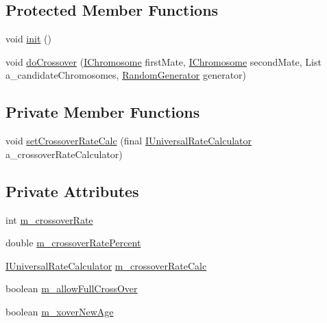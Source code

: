 \subsection*{Protected Member Functions}
\begin{DoxyCompactItemize}
\item 
void \hyperlink{classorg_1_1jgap_1_1impl_1_1_crossover_operator_aa912b24ed525835736758d64e373207d}{init} ()
\item 
void \hyperlink{classorg_1_1jgap_1_1impl_1_1_crossover_operator_a4e72f9a7da7293b0efd6c227ce496f22}{do\-Crossover} (\hyperlink{interfaceorg_1_1jgap_1_1_i_chromosome}{I\-Chromosome} first\-Mate, \hyperlink{interfaceorg_1_1jgap_1_1_i_chromosome}{I\-Chromosome} second\-Mate, List a\-\_\-candidate\-Chromosomes, \hyperlink{interfaceorg_1_1jgap_1_1_random_generator}{Random\-Generator} generator)
\end{DoxyCompactItemize}
\subsection*{Private Member Functions}
\begin{DoxyCompactItemize}
\item 
void \hyperlink{classorg_1_1jgap_1_1impl_1_1_crossover_operator_ac91121e8161678732d4b8c74cf793913}{set\-Crossover\-Rate\-Calc} (final \hyperlink{interfaceorg_1_1jgap_1_1_i_universal_rate_calculator}{I\-Universal\-Rate\-Calculator} a\-\_\-crossover\-Rate\-Calculator)
\end{DoxyCompactItemize}
\subsection*{Private Attributes}
\begin{DoxyCompactItemize}
\item 
int \hyperlink{classorg_1_1jgap_1_1impl_1_1_crossover_operator_aa52cbe6354a3465bccfed04dae06ee1a}{m\-\_\-crossover\-Rate}
\item 
double \hyperlink{classorg_1_1jgap_1_1impl_1_1_crossover_operator_a90f409ea79fa88fabab8dcbdbbc8a00d}{m\-\_\-crossover\-Rate\-Percent}
\item 
\hyperlink{interfaceorg_1_1jgap_1_1_i_universal_rate_calculator}{I\-Universal\-Rate\-Calculator} \hyperlink{classorg_1_1jgap_1_1impl_1_1_crossover_operator_a61a6063cd362c344fd4d394657d81976}{m\-\_\-crossover\-Rate\-Calc}
\item 
boolean \hyperlink{classorg_1_1jgap_1_1impl_1_1_crossover_operator_abe148b3654e3083ae0136f95c3fc0a22}{m\-\_\-allow\-Full\-Cross\-Over}
\item 
boolean \hyperlink{classorg_1_1jgap_1_1impl_1_1_crossover_operator_a3fd77bb9d65f47999fd875cb58d52099}{m\-\_\-xover\-New\-Age}
\end{DoxyCompactItemize}
